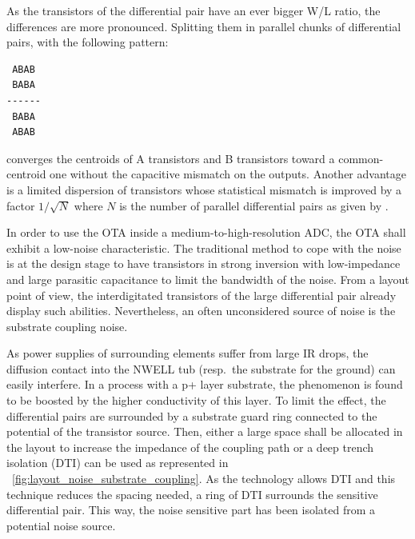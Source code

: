 As the transistors of the differential pair have an ever bigger W/L ratio, the differences are more pronounced. Splitting them in parallel chunks of differential pairs, with the following pattern:
\begin{vbox}
    \begin{verbatim}
 ABAB
 BABA
------
 BABA
 ABAB
    \end{verbatim}
    \vspace{-2em}
\end{vbox}
converges the centroids of A transistors and B transistors toward a common-centroid one without the capacitive mismatch on the outputs. Another advantage is a limited dispersion of transistors whose statistical mismatch is improved by a factor \(1/\sqrt{N}\) where \(N\) is the number of parallel differential pairs as given by \cite{Conti2002}.

In order to use the OTA inside a medium-to-high-resolution ADC, the OTA shall exhibit a low-noise characteristic. The traditional method to cope with the noise is at the design stage to have transistors in strong inversion with low-impedance and large parasitic capacitance to limit the bandwidth of the noise. From a layout point of view, the interdigitated transistors of the large differential pair already display such abilities. Nevertheless, an often unconsidered source of noise is the substrate coupling noise.

As power supplies of surrounding elements suffer from large IR drops, the diffusion contact into the NWELL tub (resp.\ the substrate for the ground) can easily interfere. In a process with a p+ layer substrate, the phenomenon is found to be boosted by the higher conductivity of this layer. To limit the effect, the differential pairs are surrounded by a substrate guard ring connected to the potential of the transistor source. Then, either a large space shall be allocated in the layout to increase the impedance of the coupling path or a deep trench isolation (DTI) can be used as represented in \figurename~\ref{fig:layout_noise_substrate_coupling}. As the technology allows DTI and this technique reduces the spacing needed, a ring of DTI surrounds the sensitive differential pair. This way, the noise sensitive part has been isolated from a potential noise source.

